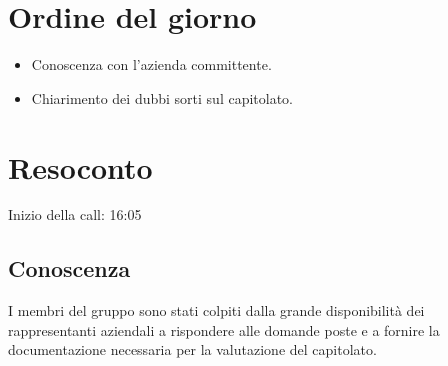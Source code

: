 \section{Ordine del giorno}
\begin{itemize}
    \item Conoscenza con l'azienda committente.
    \item Chiarimento dei dubbi sorti sul capitolato.
\end{itemize}

\section{Resoconto}
Inizio della call: 16:05

\subsection{Conoscenza}
I membri del gruppo sono stati colpiti dalla grande disponibilità dei rappresentanti aziendali a 
rispondere alle domande poste e a fornire la documentazione necessaria per la valutazione del capitolato.

